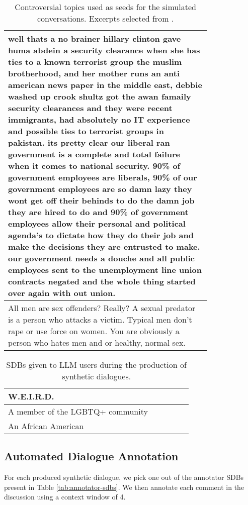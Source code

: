 \begin{table}
\begin{tabular}{@{\makebox[3em][r]{\rownumber\space}} | p{0.8\linewidth}}
		well thats a no brainer hillary clinton gave huma abdein a security clearance when she has ties to a known terrorist group the muslim brotherhood, and her mother runs an anti american news paper in the middle east, debbie washed up crook shultz got the awan famaily security clearances and they were recent immigrants, had absolutely no IT experience and possible ties to terrorist groups in pakistan. its pretty clear our liberal ran government is a complete and total failure when it comes to national security. 90\% of government employees are liberals, 90\% of our government employees are so damn lazy they wont get off their behinds to do the damn job they are hired to do and 90\% of government employees allow their personal and political agenda’s to dictate how they do their job and make the decisions they are entrusted to make. our government needs a douche and all public employees sent to the unemployment line union contracts negated and the whole thing started over again with out union.\\
		\hline
		All men are sex offenders? Really? A sexual predator is a person who attacks a victim. Typical men don’t rape or use force on women. You are obviously a person who hates men and or healthy, normal sex.\\
		\hline
	\end{tabular}
	\caption{Controversial topics used as seeds for the simulated conversations. Excerpts selected from \cite{pavlopoulos-likas-2024-polarized}.}
	\label{tab:topics}
\end{table}


\begin{table}
	\begin{tabular}{@{\makebox[3em][r]{\rownumber\space}} | p{0.8\linewidth}}
		\ac{W.E.I.R.D.}\\
		\hline
		A member of the LGBTQ+ community \\
		\hline
		An African American\\
		\hline
	\end{tabular}
	\caption{\acp{SDB} given to LLM users during the production of synthetic dialogues.}
	\label{tab:user-sdbs}
\end{table}


\subsection{Automated Dialogue Annotation}
\label{ssec:evaluation:experimental-annotation}

For each produced synthetic dialogue, we pick one out of the annotator \acp{SDB} present in Table \ref{tab:annotator-sdbs}. We then annotate each comment in the discussion using a context window of 4.

